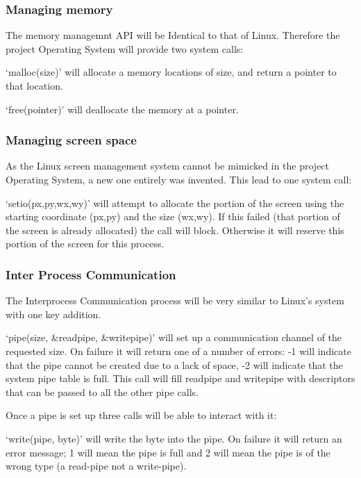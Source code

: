 \documentclass[a4paper]{report}
\begin{document}
\subsubsection*{Managing memory}

The memory managemnt API will be Identical to that of Linux. Therefore the project Operating System will provide two system calls:

`malloc(size)' will allocate a memory locations of size, and return a pointer to that location.

`free(pointer)' will deallocate the memory at a pointer.

\subsubsection*{Managing screen space}

As the Linux screen management system cannot be mimicked in the project Operating System, a new one entirely was invented. This lead to one system call:

`setio(px,py,wx,wy)' will attempt to allocate the portion of the screen using the starting coordinate (px,py) and the size (wx,wy). If this failed (that portion of the screen is already allocated) the call will block. Otherwise it will reserve this portion of the screen for this process.


\subsubsection*{Inter Process Communication}

The Interprocess Communication process will be very similar to Linux's system with one key addition.

`pipe(size, \&readpipe, \&writepipe)' will set up a communication channel of the requested size. On failure it will return one of a number of errors: -1 will indicate that the pipe cannot be created due to a lack of space, -2 will indicate that the system pipe table is full. This call will fill readpipe and writepipe with descriptors that can be passed to all the other pipe calls.

Once a pipe is set up three calls will be able to interact with it:

`write(pipe, byte)' will write the byte into the pipe. On failure it will return an error message; 1 will mean the pipe is full and 2 will mean the pipe is of the wrong type (a read-pipe not a write-pipe).
\end{document}
